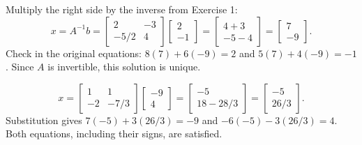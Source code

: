Multiply the right side by the inverse from Exercise 1:
\[
 x=A^{-1}b=\begin{bmatrix}2&-3\\-5/2&4\end{bmatrix}
 \begin{bmatrix}2\\-1\end{bmatrix}
 =\begin{bmatrix}4+3\\-5-4\end{bmatrix}
 =\begin{bmatrix}7\\-9\end{bmatrix}.
\]
Check in the original equations: $8(7)+6(-9)=2$ and
$5(7)+4(-9)=-1$. Since $A$ is invertible, this solution is unique.

\[
 x=\begin{bmatrix}1&1\\-2&-7/3\end{bmatrix}
 \begin{bmatrix}-9\\4\end{bmatrix}
 =\begin{bmatrix}-5\\18-28/3\end{bmatrix}
 =\begin{bmatrix}-5\\26/3\end{bmatrix}.
\]
Substitution gives $7(-5)+3(26/3)=-9$ and
$-6(-5)-3(26/3)=4$. Both equations, including their signs, are satisfied.

